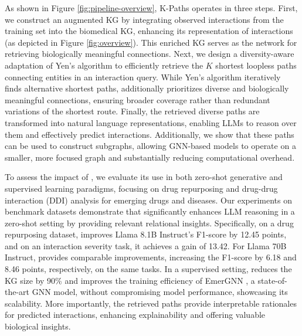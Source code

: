 As shown in Figure \ref{fig:pipeline-overview}, K-Paths operates in three steps. First, we construct an augmented KG by integrating observed interactions from the training set into the biomedical KG, enhancing its representation of interactions (as depicted in Figure \ref{fig:overview}). 
This enriched KG serves as the network for retrieving biologically meaningful connections.
Next, we design a diversity-aware adaptation of Yen's algorithm \cite{yen1971finding} to efficiently retrieve the $K$ shortest loopless paths connecting entities in an interaction query.  
While Yen's algorithm iteratively finds alternative shortest paths, \sys additionally prioritizes diverse and biologically meaningful
connections, ensuring broader coverage rather than redundant variations of the shortest route.
Finally, the retrieved diverse paths are transformed into natural language representations, enabling LLMs to reason over them and effectively predict interactions. 
Additionally, we show that these paths can be used to construct subgraphs, allowing GNN-based models to operate on a smaller, more focused graph and substantially reducing computational overhead.

To assess the impact of \sys, we evaluate its use in both zero-shot generative and supervised learning paradigms, focusing on drug repurposing and drug-drug interaction (DDI) analysis for emerging drugs and diseases.
Our experiments on benchmark datasets demonstrate that \sys significantly enhances LLM reasoning in a zero-shot setting by providing relevant relational insights. Specifically, on a drug repurposing dataset, \sys improves Llama 8.1B Instruct’s F1-score by 12.45 points, and on an interaction severity task, it achieves a gain of 13.42.
For Llama 70B Instruct, \sys provides comparable improvements, increasing the F1-score by 6.18 and 8.46 points, respectively, on the same tasks.
In a supervised setting, \sys reduces the KG size by 90\% and improves the training efficiency of EmerGNN \cite{zhang2023emergingdruginteractionprediction}, a state-of-the-art GNN model, without compromising model performance, showcasing its scalability.
More importantly, the retrieved paths provide interpretable rationales for predicted interactions, enhancing explainability and offering valuable biological insights.

